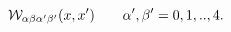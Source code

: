 \begin{equation}
{\cal W}_{\alpha\beta\alpha'\beta'}(x,x')\qquad
\alpha',\beta'=0,1,..,4. \label{eq:def}
\end{equation}

